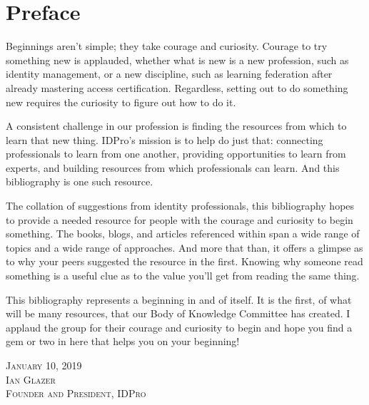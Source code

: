 \section{Preface}

Beginnings aren’t simple; they take courage and curiosity. Courage to try something new is applauded, whether what is new is a new profession, such as  identity management, or a new discipline, such as learning federation after already mastering access certification. Regardless, setting out to do something new requires the curiosity to figure out how to do it.

A consistent challenge in our profession is finding the resources from which to learn that new thing. IDPro’s mission is to help do just that: connecting professionals to learn from one another, providing opportunities to learn from experts, and building resources from which professionals can learn. And this bibliography is one such resource.

The collation of suggestions from identity professionals, this bibliography hopes to provide a needed resource for people with the courage and curiosity to begin something. The books, blogs, and articles referenced within span a wide range of topics and a wide range of approaches. And more that than, it offers a glimpse as to why your peers suggested the resource in the first. Knowing why someone read something is a useful clue as to the value you’ll get from reading the same thing.

This bibliography represents a beginning in and of itself. It is the first, of what will be many resources, that our Body of Knowledge Committee has created. I applaud the group for their courage and curiosity to begin and hope you find a gem or two in here that helps you on your beginning!

\vspace{24pt}
{\setlength{\parindent}{0cm}
\textsc{
January 10, 2019\\
Ian Glazer\\
Founder and President, IDPro}
}
